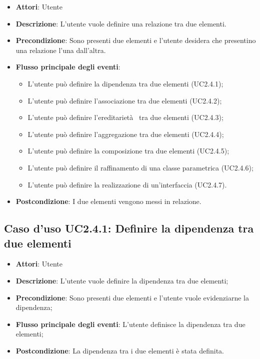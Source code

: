 \documentclass[../AnalisiDeiRequisiti.tex]{subfiles}
\begin{document}
	\begin{itemize}
		\item \textbf{Attori}: Utente
		\item \textbf{Descrizione}: L'utente vuole definire una relazione tra due elementi.
		\item \textbf{Precondizione}: Sono presenti due elementi e l'utente desidera che presentino una relazione l'una dall'altra.
		\item \textbf{Flusso principale degli eventi}: \begin{itemize}
			\item L'utente può definire la dipendenza tra due elementi (UC2.4.1);
			\item L'utente può definire l'associazione tra due elementi (UC2.4.2);
			\item L'utente può definire l'ereditarietà  tra due elementi (UC2.4.3);
			\item L'utente può definire l'aggregazione tra due elementi (UC2.4.4);
			\item L'utente può definire la composizione tra due elementi (UC2.4.5);
			\item L'utente può definire il raffinamento di una classe parametrica (UC2.4.6);
			\item L'utente può definire la realizzazione di un'interfaccia (UC2.4.7).
		\end{itemize}
		\item \textbf{Postcondizione}: I due elementi vengono messi in relazione.
	\end{itemize}
		\subsection{Caso d'uso UC2.4.1: Definire la dipendenza tra due elementi}
		\begin{itemize}
			\item \textbf{Attori}: Utente
			\item \textbf{Descrizione}: L'utente vuole definire la dipendenza tra due elementi;
			\item \textbf{Precondizione}: Sono presenti due elementi e l'utente vuole evidenziarne la dipendenza;
			\item \textbf{Flusso principale degli eventi}: L'utente definisce la dipendenza tra due elementi;
			\item \textbf{Postcondizione}: La dipendenza tra i due elementi è stata definita.
		\end{itemize}
\end{document}
